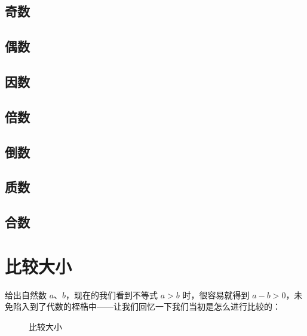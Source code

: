\subsection{奇数} \label{subsec:odd-number}

\subsection{偶数} \label{subsec:even-number}

\subsection{因数} \label{subsec:factor}

\subsection{倍数} \label{subsec:multiple}

\subsection{倒数} \label{subsec:reciprocal}

\subsection{质数} \label{subsec:prime-number}

\subsection{合数} \label{subsec:composite-number}

\section{比较大小} \label{sec:compare-size}

给出自然数 $a$、$b$，现在的我们看到不等式 $a > b$ 时，很容易就得到 $a - b > 0$，未免陷入到了代数的桎梏中——让我们回忆一下我们当初是怎么进行比较的：

\begin{figure}[H]
  \small
  \centering
  \caption{比较大小} \label{fig:compare}
\end{figure}

